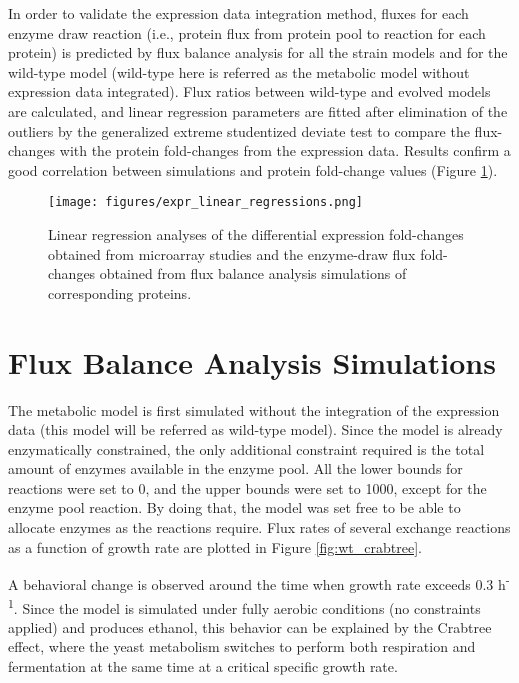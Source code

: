In order to validate the expression data integration method, fluxes for each enzyme draw reaction (i.e., protein flux from protein pool to reaction for each protein) is predicted by flux balance analysis for all the strain models and for the wild-type model (wild-type here is referred as the metabolic model without expression data integrated). Flux ratios between wild-type and evolved models are calculated, and linear regression parameters are fitted after elimination of the outliers by the generalized extreme studentized deviate test to compare the flux-changes with the protein fold-changes from the expression data. Results confirm a good correlation between simulations and protein fold-change values (Figure \ref{fig:expr_linear_regressions}).

\begin{figure}[H]
  \begin{center}
  \texttt{[image: figures/expr\_linear\_regressions.png]}
  \caption[Linear regression analyses of the fold-changes]{Linear regression analyses of the differential expression fold-changes obtained from microarray studies and the enzyme-draw flux fold-changes obtained from flux balance analysis simulations of corresponding proteins.}
  \label{fig:expr_linear_regressions}
  \end{center}
\end{figure}

\section{Flux Balance Analysis Simulations}

The metabolic model is first simulated without the integration of the expression data (this model will be referred as wild-type model). Since the model is already enzymatically constrained, the only additional constraint required is the total amount of enzymes available in the enzyme pool. All the lower bounds for reactions were set to 0, and the upper bounds were set to 1000, except for the enzyme pool reaction. By doing that, the model was set free to be able to allocate enzymes as the reactions require. Flux rates of several exchange reactions as a function of growth rate are plotted in Figure \ref{fig:wt_crabtree}.

A behavioral change is observed around the time when growth rate exceeds 0.3 h\textsuperscript{-1}. Since the model is simulated under fully aerobic conditions (no constraints applied) and produces ethanol, this behavior can be explained by the Crabtree effect, where the yeast metabolism switches to perform both respiration and fermentation at the same time at a critical specific growth rate.

